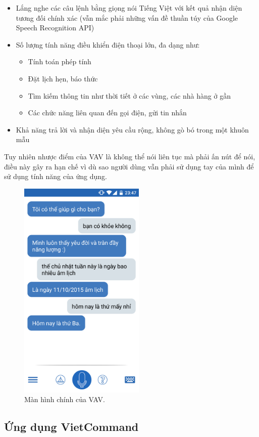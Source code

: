 \documentclass[12pt]{report}
\begin{document}
\begin{itemize}
	\item Lắng nghe các câu lệnh bằng giọng nói Tiếng Việt với kết quả nhận diện tương đối chính xác (vẫn mắc phải những vấn đề thuần túy của Google Speech Recognition API)
	\item Số lượng tính năng điều khiển điện thoại lớn, đa dạng như:
	\begin{itemize}
		\item Tính toán phép tính
		\item Đặt lịch hẹn, báo thức
		\item Tìm kiếm thông tin như thời tiết ở các vùng, các nhà hàng ở gần
		\item Các chức năng liên quan đến gọi điện, gửi tin nhắn
	\end{itemize}
	\item Khả năng trả lời và nhận diện yêu cầu rộng, không gò bó trong một khuôn mẫu
\end{itemize}

Tuy nhiên nhược điểm của VAV là không thể nói liên tục mà phải ấn nút để nói, điều này gây ra hạn chế vì dù sao người dùng vẫn phải sử dụng tay của mình để sử dụng tính năng của ứng dụng.

\begin{figure}[H]
	\centering
	\includegraphics[width=6cm]{Pics/Chap5/vav.png}
	\caption{Màn hình chính của VAV.}
\end{figure}

\subsection{Ứng dụng VietCommand}
\end{document}
